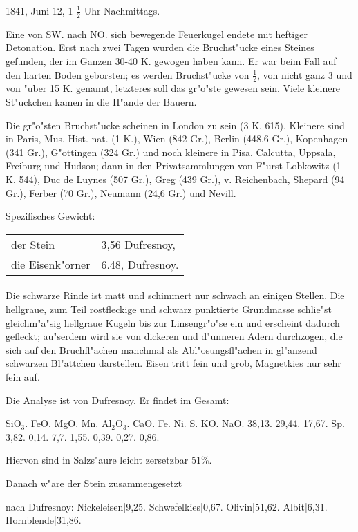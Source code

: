 \documentclass[a4paper, 11pt, oneside]{article}
\begin{document}
1841, Juni 12, 1 $\frac{1}{2}$ Uhr Nachmittags.

Eine von SW. nach NO. sich bewegende Feuerkugel endete mit heftiger Detonation. Erst nach zwei Tagen wurden die Bruchst"ucke eines Steines gefunden, der im Ganzen 30-40 K. gewogen haben kann. Er war beim Fall auf den harten Boden geborsten; es werden Bruchst"ucke von $\frac{1}{2}$, von nicht ganz 3 und von "uber 15 K. genannt, letzteres soll das gr"o"ste gewesen sein. Viele kleinere St"uckchen kamen in die H"ande der Bauern.

Die gr"o"sten Bruchst"ucke scheinen in London zu sein (3 K. 615). Kleinere sind in Paris, Mus. Hist. nat. (1 K.), Wien (842 Gr.), Berlin (448,6 Gr.), Kopenhagen (341 Gr.), G"ottingen (324 Gr.) und noch kleinere in Pisa, Calcutta, Uppsala, Freiburg und Hudson; dann in den Privatsammlungen von F"urst Lobkowitz (1 K. 544), Duc de Luynes (507 Gr.), Greg (439 Gr.), v. Reichenbach, Shepard (94 Gr.), Ferber (70 Gr.), Neumann (24,6 Gr.) und Nevill.

Spezifisches Gewicht:  
\begin{table}[!ht]
    \centering
    \begin{tabular}{l l}
        der Stein & 3,56 Dufresnoy,\\
        die Eisenk"orner & 6.48, Dufresnoy.
    \end{tabular}
\end{table}
\paragraph{}
Die schwarze Rinde ist matt und schimmert nur schwach an einigen Stellen. Die hellgraue, zum Teil rostfleckige und schwarz punktierte Grundmasse schlie"st gleichm"a"sig hellgraue Kugeln bis zur Linsengr"o"se ein und erscheint dadurch gefleckt; au"serdem wird sie von dickeren und d"unneren Adern durchzogen, die sich auf den Bruchfl"achen manchmal als Abl"osungsfl"achen in gl"anzend schwarzen Bl"attchen darstellen. Eisen tritt fein und grob, Magnetkies nur sehr fein auf.

Die Analyse ist von Dufresnoy. Er findet im Gesamt:

SiO$_{3}$. FeO. MgO. Mn. Al$_{2}$O$_{3}$. CaO. Fe. Ni. S. KO. NaO.  
38,13. 29,44. 17,67. Sp. 3,82. 0,14. 7,7. 1,55. 0,39. 0,27. 0,86.

Hiervon sind in Salzs"aure leicht zersetzbar 51\%.

Danach w"are der Stein zusammengesetzt

nach Dufresnoy:  
Nickeleisen|9,25.  
Schwefelkies|0,67.  
Olivin|51,62.  
Albit|6,31.  
Hornblende|31,86.
\end{document}
